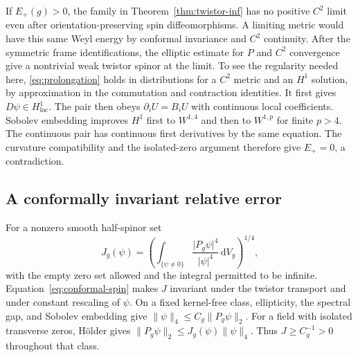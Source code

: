 \documentclass[11pt]{article}
\numberwithin{equation}{section}
\newcommand{\dd}{\mathrm{d}}
\newcommand{\abs}[1]{\lvert #1\rvert}
\newcommand{\norm}[1]{\lVert #1\rVert}
\newcommand{\dv}{\dd V_g}
\begin{document}
If \(E_+(g)>0\), the family in Theorem~\ref{thm:twistor-inf} has no
positive \(C^2\) limit even after orientation-preserving spin
diffeomorphisms. A limiting metric would have this same Weyl energy
by conformal invariance and \(C^2\) continuity. After the symmetric
frame identifications, the elliptic estimate for \(P\) and
\(C^2\) convergence give a nontrivial weak twistor spinor at the
limit. To see the regularity needed here, \eqref{eq:prolongation}
holds in distributions for a \(C^2\) metric and an \(H^1\) solution,
by approximation in the commutation and contraction identities.
It first gives \(D\psi\in H^1_{\mathrm{loc}}\). The pair then obeys
\(\partial_i U=B_iU\) with continuous local coefficients. Sobolev
embedding improves \(H^1\) first to \(W^{1,4}\) and then to \(W^{1,p}\)
for finite \(p>4\). The continuous pair has continuous first
derivatives by the same equation. The curvature compatibility and
the isolated-zero argument therefore give \(E_+=0\), a contradiction.

\subsection{A conformally invariant relative error}

For a nonzero smooth half-spinor set
\begin{equation}\label{eq:relative}
 J_g(\psi)=\left(\int_{\{\psi\ne0\}}
            \frac{\abs{P_g\psi}^4}{\abs{\psi}^4}\,\dv\right)^{1/4},
\end{equation}
with the empty zero set allowed and the integral permitted to be
infinite. Equation~\eqref{eq:conformal-spin} makes \(J\) invariant
under the twistor transport and under constant rescaling of \(\psi\).
On a fixed kernel-free class, ellipticity, the spectral gap, and
Sobolev embedding give \(\norm{\psi}_4\le C_g\norm{P_g\psi}_2\).
For a field with isolated transverse zeros, H\"older gives
\(\norm{P_g\psi}_2\le J_g(\psi)\norm{\psi}_4\).
Thus \(J\ge C_g^{-1}>0\) throughout that class.
\end{document}
